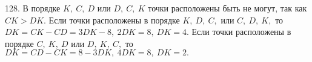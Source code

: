 128. В порядке $K,\ C,\ D$ или $D,\ C,\ K$ точки расположены быть не могут, так как $CK>DK.$ Если точки расположены в порядке $K,\ D,\ C,$ или $C,\ D,\ K,$ то $DK=CK-CD=3DK-8,\ 2DK=8,\ DK=4.$ Если точки расположены в порядке $C,\ K,\ D$ или $D,\ K,\ C,$ то $DK=CD-CK=8-3DK,\ 4DK=8,\ DK=2.$\\
